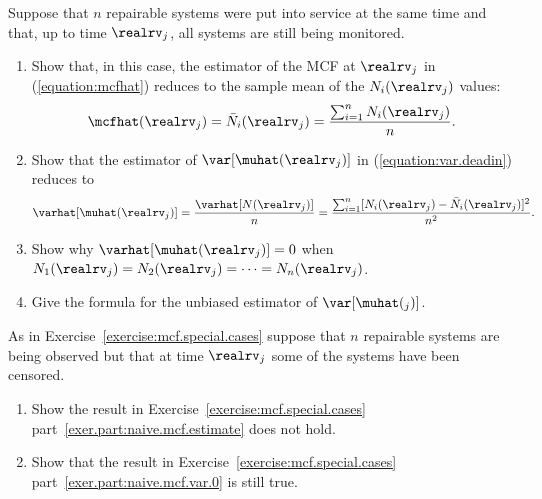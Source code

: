 \begin{exercise}
\label{exercise:mcf.special.cases}
Suppose that $n$ repairable systems
were put into service at the same time and
that, up to time 
$\realrv_{j}$, all systems are still being monitored.
\begin{enumerate}
\item
\label{exer.part:naive.mcf.estimate}
Show that, in this case, the estimator of the MCF at $\realrv_{j}$ 
in (\ref{equation:mcfhat}) reduces to the sample
mean of the $N_{i}(\realrv_{j})$ values:
\begin{displaymath}
\mcfhat(\realrv_{j})=\bar{N}_{i}(\realrv_{j})=
\frac{ \sum_{i=1}^{n} N_{i}(\realrv_{j})} {n}.
\end{displaymath}
\item
\label{exer.part:naive.mcf.var.estimate}
Show that the estimator of $\var[\muhat(\realrv_{j})]$ 
in (\ref{equation:var.deadin}) reduces to
\begin{displaymath}
\varhat[\muhat(\realrv_{j})]=\frac{\varhat[N(\realrv_{j})]}
			            {n}
=
\frac{\sum_{i=1}^{n} [N_{i}(\realrv_{j})-\bar{N}_{i}(\realrv_{j})]^{2}
}{n^{2}}.
\end{displaymath}
\item
\label{exer.part:naive.mcf.var.0}
Show why $\varhat[\muhat(\realrv_{j})]=0$
when $N_{1}(\realrv_{j})=N_{2}(\realrv_{j})=\dots=N_{n}(\realrv_{j})$.
\item
Give the formula for the unbiased 
estimator of
$\var[\muhat(_{j})]$.
\end{enumerate}
\end{exercise}

\begin{exercise1}
As in Exercise~\ref{exercise:mcf.special.cases}
suppose that $n$ repairable systems
are being observed but that at time 
$\realrv_{j}$ some of the systems
have been censored.
\begin{enumerate}
\item
Show the result in Exercise~\ref{exercise:mcf.special.cases}
part~\ref{exer.part:naive.mcf.estimate} does not hold.
\item
Show that the result in 
Exercise~\ref{exercise:mcf.special.cases}
part~\ref{exer.part:naive.mcf.var.0} is still true.
\end{enumerate}

\end{exercise1}


